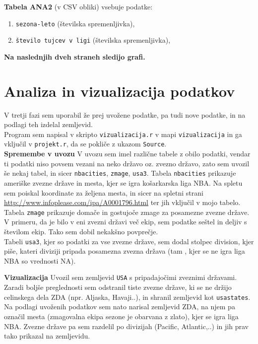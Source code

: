 \documentclass[11pt,a4paper]{article}
\begin{document}
\newline
\textbf{Tabela ANA2} (v CSV obliki) vsebuje podatke:
\begin{enumerate}
\item{\verb|sezona-leto| (številska spremenljivka),}
\item{\verb|število tujcev v ligi| (številska spremenljivka),}
\end{enumerate}
\newline
\textbf{Na naslednjih dveh straneh sledijo grafi.}





\section{Analiza in vizualizacija podatkov}

V tretji fazi sem uporabil že prej uvožene podatke, pa tudi nove podatke, in na podlagi teh izdelal zemljevid.\\

Program sem napisal v skripto \verb|vizualizacija.r| v mapi \verb|vizualizacija| in ga vključil v \verb|projekt.r|, da se pokliče z ukazom \verb|Source|.\\

\textbf{Spremembe v uvozu}
V uvozu sem imel različne tabele z obilo podatki, vendar ti podatki niso povsem vezani na neko državo oz. zvezno državo, zato sem uvozil še nekaj tabel, in sicer \verb|nbacities|, \verb|zmage|, \verb|usa3|. Tabela \verb|nbacities| prikazuje ameriške zvezne države in mesta, kjer se igra košarkarska liga NBA. Na spletu sem poiskal koordinate za željena mesta, in sicer na spletni strani \url{http://www.infoplease.com/ipa/A0001796.html} ter jih vključil v mojo tabelo.\\

Tabela \verb|zmage| prikazuje domače in gostujoče zmage za posamezne zvezne države. V primeru, da je bilo v eni zvezni državi več ekip, sem podatke seštel in deljiv s številom ekip. Tako sem dobil nekakšno povprečje.\\

Tabeli \verb|usa3|, kjer so podatki za vse zvezne države, sem dodal stolpec division, kjer piše, kateri diviziji pripada posamezna zvezna država (tam , kjer se ne igra liga NBA so vrednosti NA).

\textbf{Vizualizacija}
\newline
Uvozil sem zemljevid \verb|USA| s pripadajočimi zveznimi državami. Zaradi boljše preglednosti sem odstranil tiste zvezne države, ki se ne držijo celinskega dela ZDA (npr. Aljaska, Havaji..), in shranil zemljevid kot \verb|usastates|. Na podlagi uvoženih podatkov sem nato narisal zemljevid ZDA, na njem pa označil mesta (zmagovalna ekipa sezone je obarvana z zlato), kjer se igra liga NBA. Zvezne države pa sem razdelil po divizijah (Pacific, Atlantic,..) in jih prav tako prikazal na zemljevidu.
\end{document}
